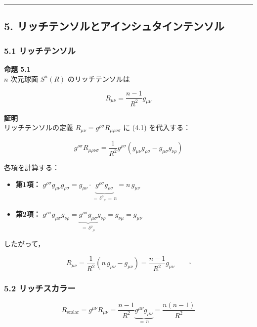 \documentclass[a4paper,11pt]{ltjsarticle}
\theoremstyle{definition}
\providecommand{\tightlist}{\setlength{\itemsep}{0pt}\setlength{\parskip}{0pt}}
\begin{document}
\begin{center}\rule{0.5\linewidth}{0.5pt}\end{center}

\subsection{5. リッチテンソルとアインシュタインテンソル}\label{ux30eaux30c3ux30c1ux30c6ux30f3ux30bdux30ebux3068ux30a2ux30a4ux30f3ux30b7ux30e5ux30bfux30a4ux30f3ux30c6ux30f3ux30bdux30eb}

\subsubsection{5.1 リッチテンソル}\label{ux30eaux30c3ux30c1ux30c6ux30f3ux30bdux30eb}

\textbf{命題 5.1}\\
\(n\) 次元球面 \(S^n(R)\) のリッチテンソルは

\[R_{\mu\nu} = \frac{n-1}{R^2}g_{\mu\nu} \tag{5.1}\]

\textbf{証明}\\
リッチテンソルの定義 \(R_{\mu\nu} = g^{\rho\sigma}R_{\mu\rho\nu\sigma}\) に (4.1) を代入する：

\[g^{\rho\sigma}R_{\mu\rho\nu\sigma} = \frac{1}{R^2}g^{\rho\sigma}(g_{\mu\nu}g_{\rho\sigma} - g_{\mu\sigma}g_{\nu\rho})\]

各項を計算する：

\begin{itemize}
\tightlist
\item
  \textbf{第1項：} \(g^{\rho\sigma}g_{\mu\nu}g_{\rho\sigma} = g_{\mu\nu}\cdot\underbrace{g^{\rho\sigma}g_{\rho\sigma}}_{=\,\delta^\rho{}_\rho\,=\,n} = n\,g_{\mu\nu}\)
\item
  \textbf{第2項：} \(g^{\rho\sigma}g_{\mu\sigma}g_{\nu\rho} = \underbrace{g^{\rho\sigma}g_{\mu\sigma}}_{=\,\delta^\rho{}_\mu}g_{\nu\rho} = g_{\nu\mu} = g_{\mu\nu}\)
\end{itemize}

したがって，

\[R_{\mu\nu} = \frac{1}{R^2}(n\,g_{\mu\nu} - g_{\mu\nu}) = \frac{n-1}{R^2}g_{\mu\nu} \qquad \square\]

\subsubsection{5.2 リッチスカラー}\label{ux30eaux30c3ux30c1ux30b9ux30abux30e9ux30fc}

\[R_{\text{scalar}} = g^{\mu\nu}R_{\mu\nu} = \frac{n-1}{R^2}\underbrace{g^{\mu\nu}g_{\mu\nu}}_{=\,n} = \frac{n(n-1)}{R^2} \tag{5.2}\]
\end{document}
